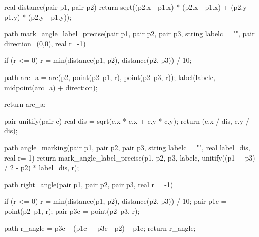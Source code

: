 \documentclass[../gatm.tex]{subfiles}
\begin{document}
\begin{asydef}


real distance(pair p1, pair p2) {
	return sqrt((p2.x - p1.x) * (p2.x - p1.x) + (p2.y - p1.y) * (p2.y - p1.y));
}

path mark_angle_label_precise(pair p1, pair p2, pair p3, string labelc = "", pair direction=(0,0), real r=-1) {
    if (r <= 0) {
    	r = min(distance(p1, p2), distance(p2, p3)) / 10;
	}

	path arc_a = arc(p2, point(p2--p1, r), point(p2--p3, r));
	label(labelc, midpoint(arc_a) + direction);

	return arc_a;
}

pair unitify(pair c) {
	real dis = sqrt(c.x * c.x + c.y * c.y);
	return (c.x / dis, c.y / dis);
}

path angle_marking(pair p1, pair p2, pair p3, string labelc = "", real label_dis, real r=-1) {
    return mark_angle_label_precise(p1, p2, p3, labelc, unitify((p1 + p3) / 2 - p2) * label_dis, r);
}

path right_angle(pair p1, pair p2, pair p3, real r = -1) {
	if (r <= 0) {
    	r = min(distance(p1, p2), distance(p2, p3)) / 10;
	}
	pair p1c = point(p2--p1, r);
	pair p3c = point(p2--p3, r);

	path r_angle = p3c -- (p1c + p3c - p2) -- p1c;
	return r_angle;
}

\end{asydef}
\end{document}

